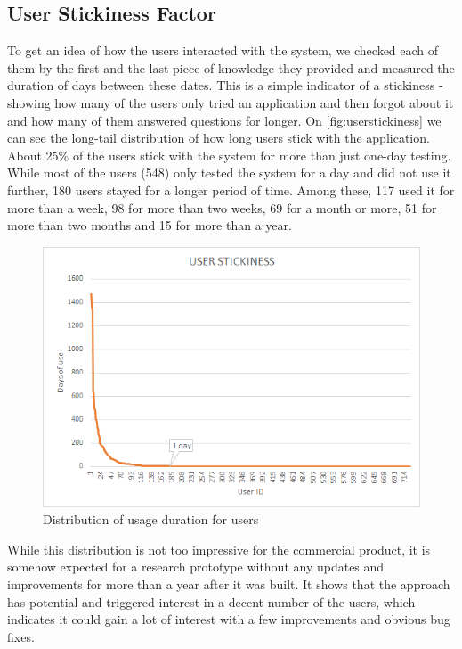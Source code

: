 {\subsection{User Stickiness Factor}
To get an idea of how the users interacted with the system, we checked each of
them by the first and the last piece of knowledge they provided and measured 
the duration of days between these dates. This is a simple indicator of a 
stickiness - showing how many of the users only tried an application and then 
forgot about it and how many of them answered questions for longer. On
\autoref{fig:userstickiness} we can see the long-tail distribution of how long 
users stick with the application. About 25\% of the users stick with the 
system for more than just one-day testing. While most of the users (548) only 
tested the system for a day and did not use it further, 180 users stayed for a 
longer period of time. Among these, 117 used it for more than a week, 98 for 
more than two weeks, 69 for a month or more, 51 for more than two months and 
15 for more than a year.
\begin{figure}[H]
	\centering
		\includegraphics[width=1\textwidth]{figures/userStickiness.png}
	\caption{Distribution of usage duration for users}
	\label{fig:userstickiness}
\end{figure}

While this distribution is not too impressive for the commercial product, 
it is somehow expected for a research prototype without any updates and 
improvements for more than a year after it was built. It shows that the 
approach has potential and triggered interest in a decent number of the users, 
which indicates it could gain a lot of interest with a few improvements and 
obvious bug fixes.

}
